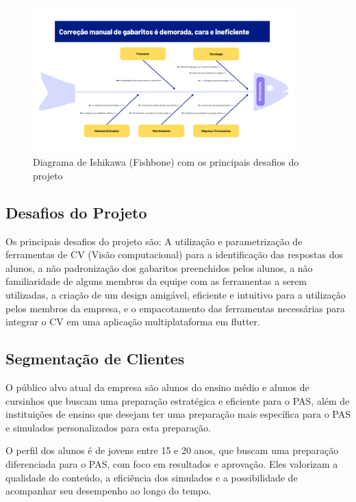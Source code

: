 \documentclass[12pt]{article}
\begin{document}
\begin{figure}[ht!]
    \centering
    \includegraphics[width=0.9\textwidth]{diagrama_fishbone.png}
    \caption{Diagrama de Ishikawa (Fishbone) com os principais desafios do projeto}
    \label{fig:fishbone}
\end{figure}


\subsection{Desafios do Projeto}

Os principais desafios do projeto são: A utilização e parametrização de ferramentas de CV (Visão computacional) para a identificação das respostas dos alunos, a não padronização dos gabaritos preenchidos pelos alunos, a não familiaridade de alguns membros da equipe com as ferramentas a serem utilizadas, a criação de um design amigável, eficiente e intuitivo para a utilização pelos membros da empresa, e o empacotamento das ferramentas necessárias para integrar o CV em uma aplicação multiplataforma em flutter.

\subsection{Segmentação de Clientes}
O público alvo atual da empresa são alunos do ensino médio e alunos de cursinhos que buscam uma preparação estratégica e eficiente para o PAS, além de instituições de ensino que desejam ter uma preparação mais específica para o PAS e simulados personalizados para esta preparação.

O perfil dos alunos é de jovens entre 15 e 20 anos, que buscam uma preparação diferenciada para o PAS, com foco em resultados e aprovação. Eles valorizam a qualidade do conteúdo, a eficiência dos simulados e a possibilidade de acompanhar seu desempenho ao longo do tempo.
\end{document}
